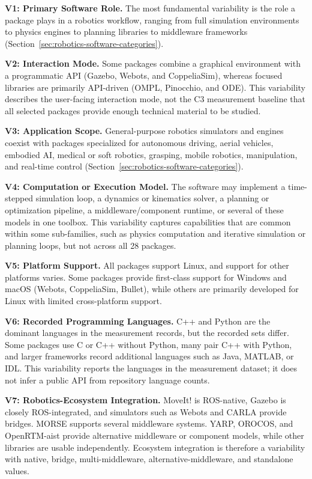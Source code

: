 \textbf{V1: Primary Software Role.} The most fundamental variability is the role a package plays in a robotics workflow, ranging from full simulation environments to physics engines to planning libraries to middleware frameworks (Section~\ref{sec:robotics-software-categories}).

\textbf{V2: Interaction Mode.} Some packages combine a graphical environment with a programmatic API (Gazebo, Webots, and CoppeliaSim), whereas focused libraries are primarily API-driven (OMPL, Pinocchio, and ODE). This variability describes the user-facing interaction mode, not the C3 measurement baseline that all selected packages provide enough technical material to be studied.

\textbf{V3: Application Scope.} General-purpose robotics simulators and engines coexist with packages specialized for autonomous driving, aerial vehicles, embodied AI, medical or soft robotics, grasping, mobile robotics, manipulation, and real-time control (Section~\ref{sec:robotics-software-categories}).

\textbf{V4: Computation or Execution Model.} The software may implement a time-stepped simulation loop, a dynamics or kinematics solver, a planning or optimization pipeline, a middleware/component runtime, or several of these models in one toolbox. This variability captures capabilities that are common within some sub-families, such as physics computation and iterative simulation or planning loops, but not across all 28 packages.

\textbf{V5: Platform Support.} All packages support Linux, and support for other platforms varies. Some packages provide first-class support for Windows and macOS (Webots, CoppeliaSim, Bullet), while others are primarily developed for Linux with limited cross-platform support.

\textbf{V6: Recorded Programming Languages.} C++ and Python are the dominant languages in the measurement records, but the recorded sets differ. Some packages use C or C++ without Python, many pair C++ with Python, and larger frameworks record additional languages such as Java, MATLAB, or IDL. This variability reports the languages in the measurement dataset; it does not infer a public API from repository language counts.

\textbf{V7: Robotics-Ecosystem Integration.} MoveIt! is ROS-native, Gazebo is closely ROS-integrated, and simulators such as Webots and CARLA provide bridges. MORSE supports several middleware systems. YARP, OROCOS, and OpenRTM-\allowbreak aist provide alternative middleware or component models, while other libraries are usable independently. Ecosystem integration is therefore a variability with native, bridge, multi-middleware, alternative-middleware, and standalone values.

